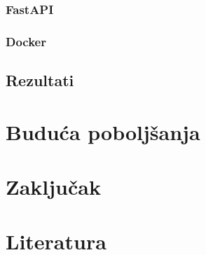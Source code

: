 \documentclass[a4paper,12pt]{article}
\begin{document}
	\subsubsection{FastAPI}
	\subsubsection{Docker}
	\subsection{Rezultati}
	\newpage
	
	\section{Buduća poboljšanja}
	\newpage
	
	\section{Zaključak}
	\newpage
	
	\section*{Literatura}
	\newpage
\end{document}
